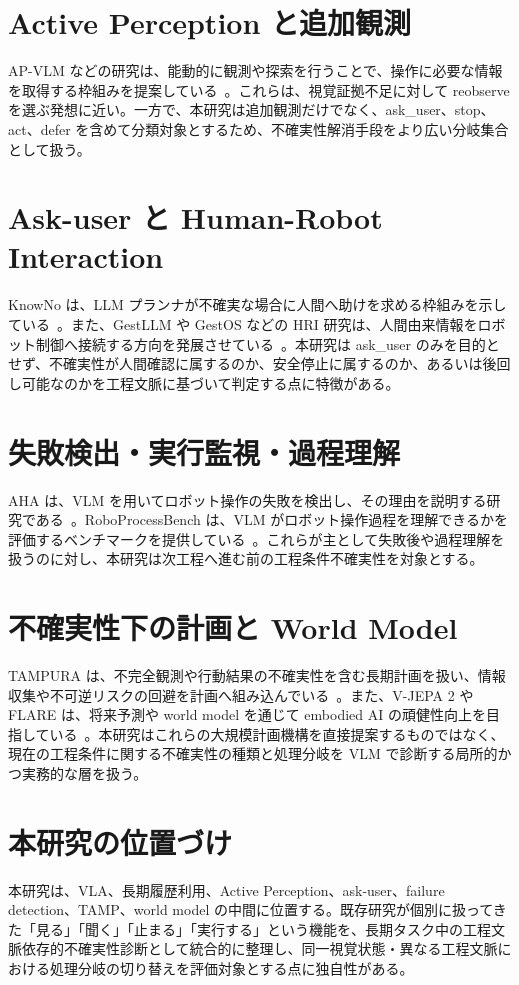 \section{Active Perception と追加観測}

AP-VLM などの研究は、能動的に観測や探索を行うことで、操作に必要な情報を取得する枠組みを提案している~\cite{apvlm}。これらは、視覚証拠不足に対して reobserve を選ぶ発想に近い。一方で、本研究は追加観測だけでなく、ask\_user、stop、act、defer を含めて分類対象とするため、不確実性解消手段をより広い分岐集合として扱う。

\section{Ask-user と Human-Robot Interaction}

KnowNo は、LLM プランナが不確実な場合に人間へ助けを求める枠組みを示している~\cite{knowno}。また、GestLLM や GestOS などの HRI 研究は、人間由来情報をロボット制御へ接続する方向を発展させている~\cite{gestllm, gestos}。本研究は ask\_user のみを目的とせず、不確実性が人間確認に属するのか、安全停止に属するのか、あるいは後回し可能なのかを工程文脈に基づいて判定する点に特徴がある。

\section{失敗検出・実行監視・過程理解}

AHA は、VLM を用いてロボット操作の失敗を検出し、その理由を説明する研究である~\cite{aha}。RoboProcessBench は、VLM がロボット操作過程を理解できるかを評価するベンチマークを提供している~\cite{roboprocessbench}。これらが主として失敗後や過程理解を扱うのに対し、本研究は次工程へ進む前の工程条件不確実性を対象とする。

\section{不確実性下の計画と World Model}

TAMPURA は、不完全観測や行動結果の不確実性を含む長期計画を扱い、情報収集や不可逆リスクの回避を計画へ組み込んでいる~\cite{tampura}。また、V-JEPA 2 や FLARE は、将来予測や world model を通じて embodied AI の頑健性向上を目指している~\cite{vjepa2, flare}。本研究はこれらの大規模計画機構を直接提案するものではなく、現在の工程条件に関する不確実性の種類と処理分岐を VLM で診断する局所的かつ実務的な層を扱う。

\section{本研究の位置づけ}

本研究は、VLA、長期履歴利用、Active Perception、ask-user、failure detection、TAMP、world model の中間に位置する。既存研究が個別に扱ってきた「見る」「聞く」「止まる」「実行する」という機能を、長期タスク中の工程文脈依存的不確実性診断として統合的に整理し、同一視覚状態・異なる工程文脈における処理分岐の切り替えを評価対象とする点に独自性がある。
